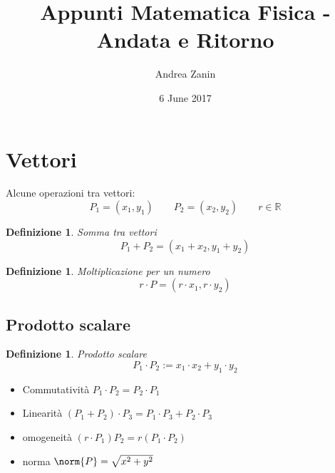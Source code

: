 \documentclass[10pt,a4paper]{article}
\author{Andrea Zanin}
\title{Appunti Matematica Fisica - Andata e Ritorno}
\date{6 June 2017}
\theoremstyle{plain}
\newtheorem{definizione}[subsection]{Definizione}
\theoremstyle{definition}
\begin{document}
	\maketitle
	\section{Vettori}
	Alcune operazioni tra vettori:
	\[P_1=(x_1,y_1) \qquad P_2=(x_2,y_2)\qquad r \in \mathbb{R}\]
	\begin{definizione} Somma tra vettori
		\label{vec:sum}
		\[P_1 + P_2 = (x_1+x_2, y_1+y_2)\]
	\end{definizione}
	\begin{definizione} Moltiplicazione per un numero
		\label{vec:nprod}
		\[r\cdot P=(r\cdot x_1, r\cdot y_2)\]
	\end{definizione}
	\subsection{Prodotto scalare}
	\begin{definizione} Prodotto scalare
		\label{vec:sprod}
		\[P_1 \cdot P_2 := x_1 \cdot x_2 + y_1 \cdot y_2\]
	\end{definizione}
	\begin{itemize}
		\item Commutatività $P_1 \cdot P_2 = P_2 \cdot P_1$
		\item Linearità $(P_1 + P_2)\cdot P_3 = P_1 \cdot P_3 + P_2 \cdot P_3$
		\item omogeneità $(r\cdot P_1)P_2 = r(P_1 \cdot P_2)$
		\item norma $\norm{P}=\sqrt{x^2 + y^2}$
	\end{itemize}
\end{document}
